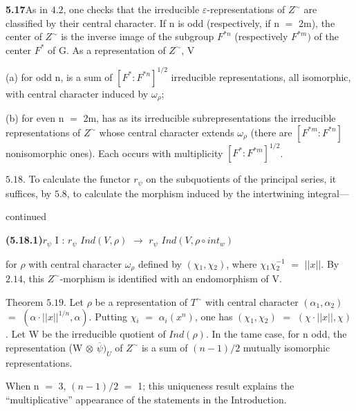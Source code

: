 \documentclass[10pt,a4paper]{article}
\begin{document}
\par\noindent\textbf{5.17}\quad As in $4.2$, one checks that the irreducible $\varepsilon{}$-representations of $Z^\sim$ are classified by their central character. If n is odd (respectively, if n $=$ 2m), the center of $Z^\sim$ is the inverse image of the subgroup $F^{*n}$ (respectively $F^{*m})$ of the center $F^*$ of G. As a representation of $Z^\sim$, V\par
\par (a) for odd n, is a sum of $[F^*:F^{*n}]^{1/2}$ irreducible representations, all isomorphic, with central character induced by $\omega{}_\rho{}$;\par
\par (b) for even n $=$ 2m, has as its irreducible subrepresentations the irreducible representations of $Z^\sim$ whose central character extends $\omega{}_\rho{}$ (there are $[F^{*m}:F^{*n}]$ nonisomorphic ones). Each occurs with multiplicity $[F^*:F^{*m}]^{1/2}$.\par
\par $5.18$. To calculate the functor $r_\psi{}$ on the subquotients of the principal series, it suffices, by $5.8$, to calculate the morphism induced by the intertwining integral---\par

\clearpage
{}
\label{d035-physical-027}
\par continued\par
\par\noindent\textbf{(5.18.1)}\quad $r_\psi{}$ I : $r_\psi{}$ $Ind(V,\rho{})$ $\to{}$ $r_\psi{}$ $Ind(V,\rho{}∘int_w)$\par
\par for $\rho{}$ with central character $\omega{}_\rho{}$ defined by $(\chi{}_1,\chi{}_2)$, where $\chi{}_1\chi{}_2^{-1}$ $=$ $||x||$. By $2.14$, this $Z^\sim$-morphism is identified with an endomorphism of V.\par
\par Theorem $5.19$. Let $\rho{}$ be a representation of $T^\sim$ with central character $(\alpha{}_1,\alpha{}_2)$ $=$ $(\alpha{}\cdot{}||x||^{1/n},\alpha{})$. Putting $\chi{}_i$ $=$ $\alpha{}_i(x^n)$, one has $(\chi{}_1,\chi{}_2)$ $=$ $(\chi{}\cdot{}||x||,\chi{})$. Let W be the irreducible quotient of $Ind(\rho{})$. In the tame case, for n odd, the representation (W $\otimes{}$ $\overline{\psi{}})_U$ of $Z^\sim$ is a sum of $(n-1)/2$ mutually isomorphic representations.\par
\par When n $=$ 3, $(n-1)/2$ $=$ 1; this uniqueness result explains the ``multiplicative'' appearance of the statements in the Introduction.\par
\end{document}
